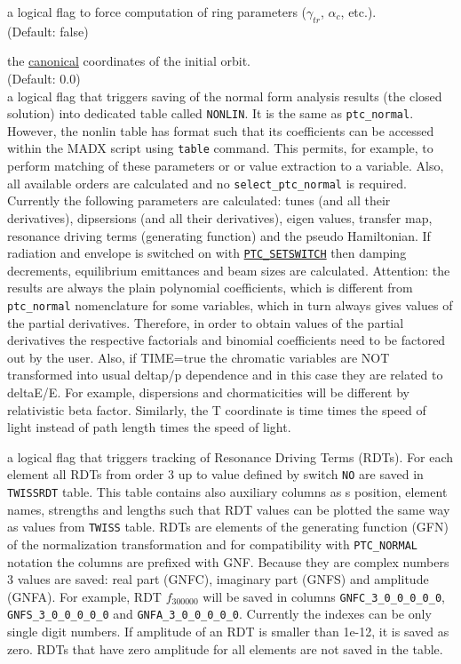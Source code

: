 \begin{madlist}
   a logical flag to force computation of ring
  parameters ($\gamma_{tr}$, $\alpha_c$, etc.). \\ 
  (Default: false)

   the
  \hyperref[subsec:tables-canon]{canonical} coordinates of the initial
  orbit. \\ (Default: 0.0) \\
  
   a logical flag that triggers saving of the normal form analysis results
  (the closed solution) into dedicated table called \texttt{NONLIN}. It is the same as  \texttt{ptc\_normal}.
   However, the nonlin table has format such that its coefficients can be accessed within the MADX script using 
   \texttt{table} command. This permits, for example, to perform matching of these parameters or or value extraction to a variable. 
   Also, all available orders are calculated and 
   no \texttt{select\_ptc\_normal} is required.
   Currently the following parameters are calculated: tunes (and all their derivatives), 
   dipsersions (and all their derivatives), eigen values, transfer map, 
   resonance driving terms (generating function) and the pseudo Hamiltonian.
   If radiation and envelope is switched on with \hyperref[sec:ptc-setswitch]{\texttt{PTC\_SETSWITCH}}
   then damping decrements, equilibrium emittances and beam sizes are calculated.
   Attention: the results are always the plain polynomial coefficients, 
   which is different from  \texttt{ptc\_normal} nomenclature for some variables, 
   which in turn always gives values of the partial derivatives.
   Therefore, in order to obtain values of the partial derivatives the respective factorials 
   and binomial coefficients need to be factored out by the user. 
   Also, if TIME=true the chromatic variables are NOT transformed into usual deltap/p dependence
   and in this case they are related to deltaE/E. For example, dispersions and chormaticities will be 
   different by relativistic beta factor. Similarly, the T coordinate is time times the speed of light 
   instead of path length times the speed of light.
   
    a logical flag that triggers tracking of Resonance Driving Terms (RDTs).
   For each element all RDTs from order 3 up to value defined by switch \texttt{NO} are saved 
   in \texttt{TWISSRDT} table. 
   This table contains also auxiliary columns as s position, element names, strengths and lengths 
   such that RDT values can be plotted the same way as values from \texttt{TWISS} table.
   RDTs are elements of the generating function (GFN) of the normalization transformation
   and for compatibility with \texttt{PTC\_NORMAL} notation the columns are prefixed with GNF.
   Because they are complex numbers 3 values are saved: real part (GNFC), imaginary part (GNFS) and amplitude (GNFA).
   For example, RDT $f_{300000}$ will be saved in columns 
   \texttt{GNFC\_3\_0\_0\_0\_0\_0}, \texttt{GNFS\_3\_0\_0\_0\_0\_0} and \texttt{GNFA\_3\_0\_0\_0\_0\_0}.
   Currently the indexes can be only single digit numbers.
   If amplitude of an RDT is smaller than 1e-12, it is saved as zero.
   RDTs that have zero amplitude for all elements are not saved in the table.
   

\end{madlist}
